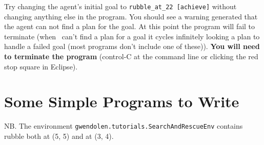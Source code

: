 Try changing the agent's initial goal to \lstinline{rubble_at_22 [achieve]} without changing anything else in the program.  You should see a warning generated that the agent can not find a plan for the goal.  At this point the program will fail to terminate (when \gwendolen\ can't find a plan for a goal it cycles infinitely looking a plan to handle a failed goal (most programs don't include one of these)).  {\bf You will need to terminate the program} (control-C at the command line or clicking the red stop square in Eclipse).

\section{Some Simple Programs to Write}
\label{ex:tutorial3}
NB.  The environment \texttt{gwendolen.tutorials.SearchAndRescueEnv} contains rubble both at (5, 5) and at (3, 4).
